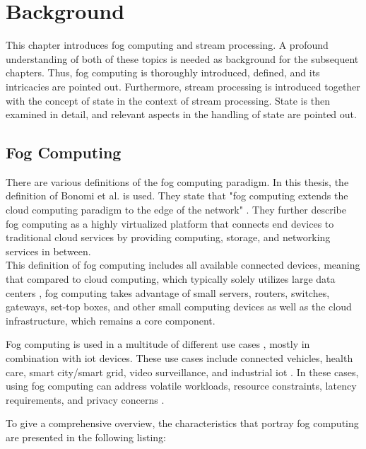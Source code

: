\section{Background}
\label{lBackground}
This chapter introduces fog computing and stream processing. A profound understanding of both of these topics is needed as background for the subsequent chapters. Thus, fog computing is thoroughly introduced, defined, and its intricacies are pointed out. Furthermore, stream processing is introduced together with the concept of state in the context of stream processing. State is then examined in detail, and relevant aspects in the handling of state are pointed out.

\subsection{Fog Computing}
\label{lFogComputing}
There are various definitions of the fog computing paradigm. In this thesis, the definition of Bonomi et al. \cite{Bonomi.2012} is used. They state that "fog computing extends the cloud computing paradigm to the edge of the network" \cite{Bonomi.2012}. They further describe fog computing as a highly virtualized platform that connects end devices to traditional cloud services by providing computing, storage, and networking services in between.\\
This definition of fog computing includes all available connected devices, meaning that compared to cloud computing, which typically solely utilizes large data centers \cite{Yousefpour.2019}, fog computing takes advantage of small servers, routers, switches, gateways, set-top boxes, and other small computing devices \cite{Yousefpour.2019} as well as the cloud infrastructure, which remains a core component.\par

Fog computing is used in a multitude of different use cases \cite{Yousefpour.2019}, mostly in combination with \gls{iot} devices. These use cases include connected vehicles, health care, smart city/smart grid, video surveillance, and industrial \gls{iot} \cite{Yousefpour.2019}. In these cases, using fog computing can address volatile workloads, resource constraints, latency requirements, and privacy concerns \cite{Yigitoglu.2017}.\par


To give a comprehensive overview, the characteristics that portray fog computing are presented in the following listing: 

